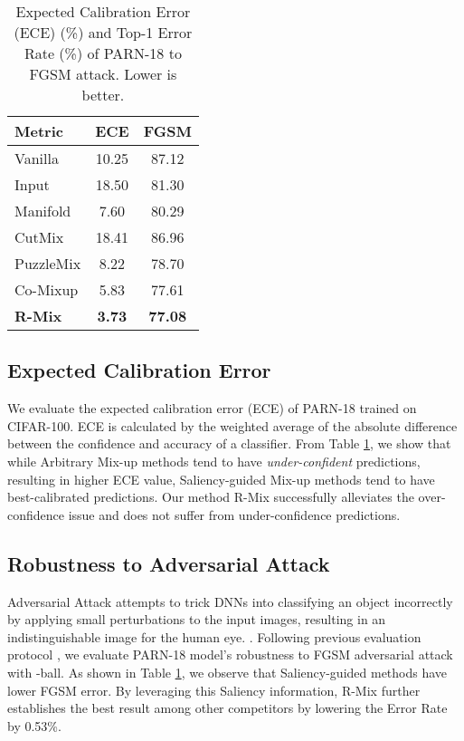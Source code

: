 \documentclass[letterpaper]{article} \usepackage[submission]{aaai23}  \usepackage{times}  \usepackage{helvet}  \usepackage{courier}  \usepackage[hyphens]{url}  \usepackage{graphicx} \urlstyle{rm} \def\UrlFont{\rm}  \usepackage{natbib}  \usepackage{caption} \frenchspacing  \setlength{\pdfpagewidth}{8.5in} \setlength{\pdfpageheight}{11in}
\newcommand{\rrlmix}{{R-Mix}}
\begin{document}
\begin{table}[h!]
\centering
\begin{tabular}{lcc}
\hline
Metric & ECE & FGSM \\ \hline
Vanilla & 10.25 & 87.12 \\
Input & 18.50 & 81.30 \\
Manifold & 7.60 & 80.29 \\
CutMix & 18.41 & 86.96 \\
PuzzleMix & 8.22 & 78.70 \\ 
Co-Mixup & 5.83 & 77.61 \\\hline
\textbf{R-Mix} & \textbf{3.73} & \textbf{77.08} \\ \hline
\end{tabular}
\caption{Expected Calibration Error (ECE) (\%) and Top-1 Error Rate (\%) of PARN-18 to FGSM attack. Lower is better.}
\label{tab:ecefgsm}
\end{table}

\subsection{Expected Calibration Error}
We evaluate the expected calibration error (ECE) \cite{guo2017calibration} of PARN-18 trained
on CIFAR-100. ECE is calculated by the weighted average of the absolute difference between the confidence and accuracy of a classifier. From Table \ref{tab:ecefgsm}, we show that while Arbitrary Mix-up methods tend to have \emph{under-confident} predictions, resulting in higher ECE value, Saliency-guided Mix-up methods tend to have best-calibrated predictions. Our method \rrlmix{} successfully alleviates the over-confidence issue and does not suffer from under-confidence predictions.

\subsection{Robustness to Adversarial Attack}
Adversarial Attack attempts to trick DNNs into classifying an object incorrectly by applying small perturbations to the input images, resulting in an indistinguishable image for the human eye. \cite{szegedy2013intriguing}. Following previous evaluation protocol \cite{kim2020puzzlemix}, we evaluate PARN-18 model's robustness to FGSM adversarial attack with   -ball. As shown in Table \ref{tab:ecefgsm}, we observe that Saliency-guided methods have lower FGSM error. By leveraging this Saliency information, \rrlmix{} further establishes the best result among other competitors by lowering the Error Rate by 0.53\%. 
\end{document}
